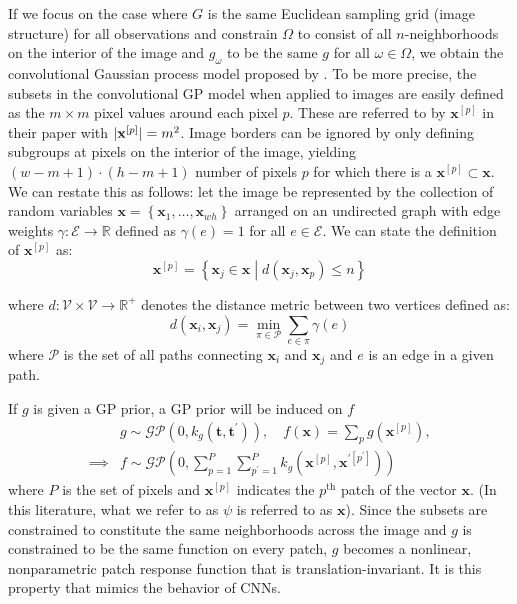 \documentclass{article}
\DeclarePairedDelimiter\abs{\lvert}{\rvert}\DeclarePairedDelimiter\norm{\lVert}{\rVert}\newcommand{\p}[1]{\left(#1\right)}
\newcommand{\qb}[1]{ \left[#1 \right]}
\newcommand{\cb}[1]{\left \{ #1 \right \}}
\begin{document}
If we focus on the case where $G$ is the same Euclidean sampling grid (image structure) for all observations and constrain $\Omega$ to consist of all $n$-neighborhoods on the interior of the image and $g_\omega$ to be the same $g$ for all $\omega \in \Omega$, we obtain the convolutional Gaussian process model proposed by \citet{convgp}. To be more precise, the subsets in the convolutional GP model when applied to images are easily defined as the $m \times m$ pixel values around each pixel $p$. These are referred to by $\mathbf{x}^{\qb{p}}$ in their paper with $\abs{\mathbf{x}^{\qb{p}}} = m^2$. Image borders can be ignored by only defining subgroups at pixels on the interior of the image, yielding $(w-m+1) \cdot (h - m +1)$ number of pixels $p$ for which there is a $\mathbf{x}^{\qb{p}} \subset \bm{x}$. We can restate this as follows: let the image be represented by the collection of random variables $\bm{x} = \cb{\bm{x}_1, \ldots, \bm{x}_{wh}}$ arranged on an undirected graph with edge weights $\gamma: \mathcal{E} \to \mathbb{R}$ defined as $\gamma(e) = 1$ for all $e\in \mathcal{E}$. We can state the definition of $\mathbf{x}^{\qb{p}}$ as:
\begin{equation}\label{eq:imChunk}
\mathbf{x}^{\qb{p}} = \cb{\bm{x}_j \in \bm{x} \middle| d(\bm{x}_j, \bm{x}_p) \leq n}
\end{equation} 

where $d : \mathcal{V}\times \mathcal{V} \to \mathbb{R}^+$ denotes the distance metric between two vertices defined as:
\begin{equation}\label{eq:graphDistance}
d(\bm{x}_i, \bm{x}_j) = \min_{\pi\in \mathcal{P}} \sum_{e \in \pi} \gamma(e)
\end{equation}
where $\mathcal{P}$ is the set of all paths connecting $\bm{x}_i$ and $\bm{x}_j$ and $e$ is an edge in a given path.  

If $g$ is given a GP prior, a GP prior will be induced on $f$
\begin{equation}
\begin{split}
& g \sim \mathcal{GP}\p{0, k_g\p{\mathbf{t}, \mathbf{t^\prime}}}, \quad f(\mathbf{x}) = \sum_p g\p{\mathbf{x}^{\qb{p}}}, \\
\implies & f\sim \mathcal{GP}\p{0, \sum_{p=1}^P\sum_{p^\prime = 1}^P k_g\p{\mathbf{x}^{\qb{p}}, \mathbf{x}^{\prime\qb{p^\prime}}}}
\end{split}
\end{equation}
where $P$ is the set of pixels and $\mathbf{x}^{\qb{p}}$ indicates the $p^{\text{th}}$ patch of the vector $\mathbf{x}$. (In this literature, what we refer to as $\psi$ is referred to as $\bm{x}$).
Since the subsets are constrained to constitute the same neighborhoods across the image and $g$ is constrained to be the same function on every patch, $g$ becomes a nonlinear, nonparametric patch response function that is translation-invariant. It is this property that mimics the behavior of CNNs.
\end{document}
